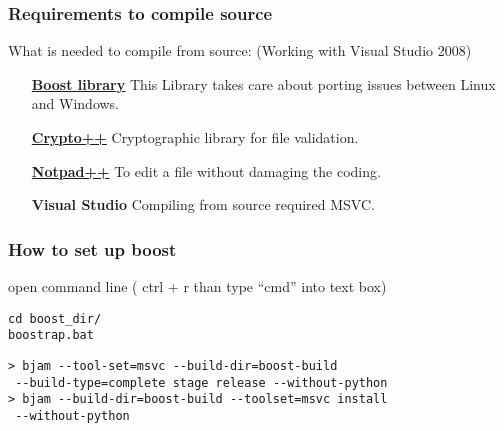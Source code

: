\subsubsection{Requirements to compile source}
What is needed to compile from source: (Working with Visual Studio 2008)
\begin{itemize}
\item [ \href{http://sourceforge.net/projects/boost/files/boost/1.44.0/boost_1_44_0.7z/download}{\textbf{Boost library}} ] This Library takes care about porting issues between Linux and Windows.
\item [ \href{http://www.cryptopp.com/}{\textbf{Crypto++}} ] Cryptographic library for file validation.
\item [ \href{http://notepad-plus-plus.org/}{\textbf{Notpad++}} ] To edit a file without damaging the coding.
\item [ \textbf{Visual Studio} ] Compiling from source required MSVC.
\end{itemize}

\subsubsection{How to set up boost}
open command line ( ctrl + r than type ``cmd'' into text box)
\begin{verbatim}
cd boost_dir/
boostrap.bat
\end{verbatim}

\begin{verbatim} 
> bjam --tool-set=msvc --build-dir=boost-build 
 --build-type=complete stage release --without-python
> bjam --build-dir=boost-build --toolset=msvc install 
 --without-python
\end{verbatim}

